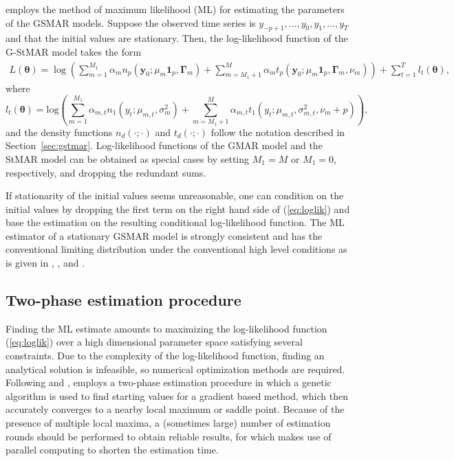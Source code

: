 \documentclass[nojss]{jss} %
\begin{document}
 employs the method of maximum likelihood (ML) for estimating the parameters of the GSMAR models. Suppose the observed time series is $y_{-p+1},...,y_0,y_1,...,y_T$ and that the initial values are stationary. Then, the log-likelihood function of the G-StMAR model takes the form
\begin{multline}\label{eq:loglik}
L(\boldsymbol{\theta})=
\log\left(\sum_{m=1}^{M_1}\alpha_m n_p(\boldsymbol{y}_0;\mu_m\mathbf{1}_p,\boldsymbol{\Gamma}_m)+\sum_{m=M_1+1}^{M}\alpha_m t_p(\boldsymbol{y}_0;\mu_m\mathbf{1}_p,\boldsymbol{\Gamma}_m,\nu_m) \right)+\sum_{t=1}^{T}l_t(\boldsymbol{\theta}),
\end{multline}
where
\begin{equation}\label{eq:loglik2}
l_t(\boldsymbol{\theta})=\text{log}\left(\sum_{m=1}^{M_1}\alpha_{m,t}n_1(y_t;\mu_{m,t},\sigma_m^2)+\sum_{m=M_1+1}^{M}\alpha_{m,t} t_1\left(y_t;\mu_{m,t},\sigma_{m,t}^2,\nu_m+p\right)\right),
\end{equation}
and the density functions $n_d(\cdot;\cdot)$ and $t_d\left(\cdot;\cdot\right)$ follow the notation described in Section~\ref{sec:gstmar}. Log-likelihood functions of the GMAR model and the StMAR model can be obtained as special cases by setting $M_1=M$ or $M_1=0$, respectively, and dropping the redundant sums.

If stationarity of the initial values seems unreasonable, one can condition on the initial values by dropping the first term on the right hand side of (\ref{eq:loglik}) and base the estimation on the resulting conditional log-likelihood function. The ML estimator of a stationary GSMAR model is strongly consistent and has the conventional limiting distribution under the conventional high level conditions as is given in \citet[pp.254-255]{Kalliovirta+Meitz+Saikkonen:2015}, \citet[Theorem 3]{Meitz+Preve+Saikkonen:2021}, and \citet[Theorem 2]{Virolainen:2020}.

\subsection{Two-phase estimation procedure}\label{sec:estimscheme}

Finding the ML estimate amounts to maximizing the log-likelihood function (\ref{eq:loglik}) over a high dimensional parameter space satisfying several constraints. Due to the complexity of the log-likelihood function, finding an analytical solution is infeasible, so numerical optimization methods are required. Following \cite{Dorsey+Mayer:1995} and \cite{Meitz+Preve+Saikkonen:2021, Meitz+Preve+Saikkonen2:2018},  employs a two-phase estimation procedure in which a genetic algorithm is used to find starting values for a gradient based method, which then accurately converges to a nearby local maximum or saddle point. Because of the presence of multiple local maxima, a (sometimes large) number of estimation rounds should be performed to obtain reliable results, for which  makes use of parallel computing to shorten the estimation time.
\end{document}
